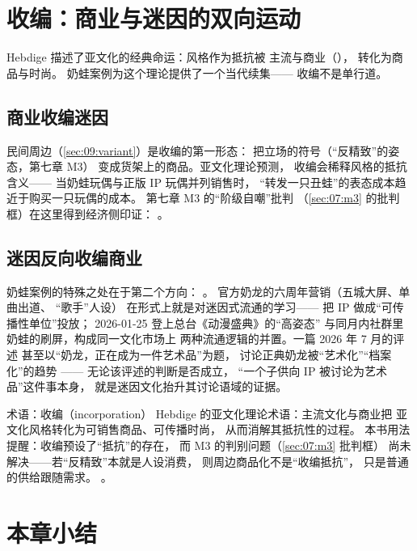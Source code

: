 \section{收编：商业与迷因的双向运动}\label{sec:09:recoup}

Hebdige 描述了亚文化的经典命运：风格作为抵抗被
主流与商业（），
转化为商品与时尚\cite{hebdige1979subculture}。
奶蛙案例为这个理论提供了一个当代续集——
收编不是单行道。

\subsection{商业收编迷因}

民间周边（\ref{sec:09:variant}）是收编的第一形态：
把立场的符号（“反精致”的姿态，第七章 M3）
变成货架上的商品。亚文化理论预测，
收编会稀释风格的抵抗含义——
当奶蛙玩偶与正版 IP 玩偶并列销售时，
“转发一只丑蛙”的表态成本趋近于购买一只玩偶的成本。
第七章 M3 的“阶级自嘲”批判
（\ref{sec:07:m3} 的批判框）在这里得到经济侧印证：
。

\subsection{迷因反向收编商业}

奶蛙案例的特殊之处在于第二个方向：
。
官方奶龙的六周年营销（五城大屏、单曲出道、
“歌手”人设\cite{chinadaily2026six}）
在形式上就是对迷因式流通的学习——
把 IP 做成“可传播性单位”投放；
2026-01-25 登上总台《动漫盛典》的“高姿态”
\cite{chinadaily2026six}
与同月内社群里奶蛙的刷屏，构成同一文化市场上
两种流通逻辑的并置。一篇 2026 年 7 月的评述
甚至以“奶龙，正在成为一件艺术品”为题，
讨论正典奶龙被“艺术化”“档案化”的趋势
\cite{yuhuoxingxing2026}——
无论该评述的判断是否成立，
“一个子供向 IP 被讨论为艺术品”这件事本身，
就是迷因文化抬升其讨论语域的证据。

\begin{nltermbox}{术语：收编（incorporation）}
  Hebdige 的亚文化理论术语：主流文化与商业把
  亚文化风格转化为可销售商品、可传播时尚，
  从而消解其抵抗性的过程\cite{hebdige1979subculture}。
  本书用法提醒：收编预设了“抵抗”的存在，
  而 M3 的判别问题（\ref{sec:07:m3} 批判框）
  尚未解决——若“反精致”本就是人设消费，
  则周边商品化不是“收编抵抗”，
  只是普通的供给跟随需求。
  。
\end{nltermbox}

\section{本章小结}\label{sec:09:summary}

